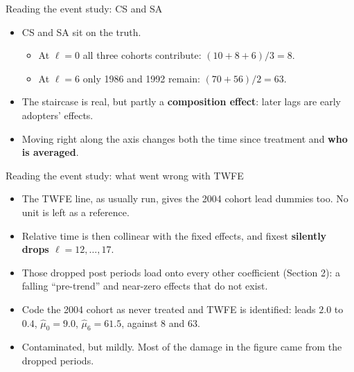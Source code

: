 \documentclass[
  11pt,
  ignorenonframetext,
  aspectratio=169,
]{beamer}
\providecommand{\tightlist}{%
  \setlength{\itemsep}{0pt}\setlength{\parskip}{0pt}}
\begin{document}
\begin{frame}{Reading the event study: CS and SA}
\protect{}\label{reading-the-event-study-cs-and-sa}
\begin{itemize}
\tightlist
\item
  CS and SA sit on the truth.

  \begin{itemize}
  \tightlist
  \item
    At \(\ell = 0\) all three cohorts contribute:
    \((10 + 8 + 6)/3 = 8\).
  \item
    At \(\ell = 6\) only 1986 and 1992 remain: \((70 + 56)/2 = 63\).
  \end{itemize}
\item
  The staircase is real, but partly a \textbf{composition effect}: later
  lags are early adopters' effects.
\item
  Moving right along the axis changes both the time since treatment and
  \textbf{who is averaged}.
\end{itemize}
\end{frame}

\begin{frame}{Reading the event study: what went wrong with TWFE}
\protect{}\label{reading-the-event-study-what-went-wrong-with-twfe}
\begin{itemize}
\tightlist
\item
  The TWFE line, as usually run, gives the 2004 cohort lead dummies too.
  No unit is left as a reference.
\item
  Relative time is then collinear with the fixed effects, and fixest
  \textbf{silently drops \(\ell = 12, \dots, 17\)}.
\item
  Those dropped post periods load onto every other coefficient (Section
  2): a falling ``pre-trend'' and near-zero effects that do not exist.
\end{itemize}

\vspace{0.4em}

\begin{itemize}
\tightlist
\item
  Code the 2004 cohort as never treated and TWFE is identified: leads
  \(2.0\) to \(0.4\), \(\hat\mu_0 = 9.0\), \(\hat\mu_{6} = 61.5\),
  against \(8\) and \(63\).
\item
  Contaminated, but mildly. Most of the damage in the figure came from
  the dropped periods.
\end{itemize}
\end{frame}
\end{document}
